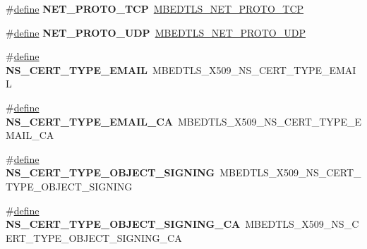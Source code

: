 \begin{DoxyCompactItemize}
\item 
\mbox{\label{compat-1_83_8h_a32ba3ba53f92561f4c6ce17476b6aa47}} 
\#\hyperlink{structdefine}{define} {\bfseries N\+E\+T\+\_\+\+P\+R\+O\+T\+O\+\_\+\+T\+CP}~\hyperlink{net__sockets_8h_a989e1bc1aae7e48ac318d5ddd24efa3b}{M\+B\+E\+D\+T\+L\+S\+\_\+\+N\+E\+T\+\_\+\+P\+R\+O\+T\+O\+\_\+\+T\+CP}
\item 
\mbox{\label{compat-1_83_8h_a10aa117699627c9d4fe7f03cfc571a73}} 
\#\hyperlink{structdefine}{define} {\bfseries N\+E\+T\+\_\+\+P\+R\+O\+T\+O\+\_\+\+U\+DP}~\hyperlink{net__sockets_8h_a8d6d212e9f0ea5756fff8d06c46f4f44}{M\+B\+E\+D\+T\+L\+S\+\_\+\+N\+E\+T\+\_\+\+P\+R\+O\+T\+O\+\_\+\+U\+DP}
\item 
\mbox{\label{compat-1_83_8h_aa06876013b3e2b9098529e18e17e96e9}} 
\#\hyperlink{structdefine}{define} {\bfseries N\+S\+\_\+\+C\+E\+R\+T\+\_\+\+T\+Y\+P\+E\+\_\+\+E\+M\+A\+IL}~M\+B\+E\+D\+T\+L\+S\+\_\+\+X509\+\_\+\+N\+S\+\_\+\+C\+E\+R\+T\+\_\+\+T\+Y\+P\+E\+\_\+\+E\+M\+A\+IL
\item 
\mbox{\label{compat-1_83_8h_a62f25762eb59728f92b07d61ae2057a5}} 
\#\hyperlink{structdefine}{define} {\bfseries N\+S\+\_\+\+C\+E\+R\+T\+\_\+\+T\+Y\+P\+E\+\_\+\+E\+M\+A\+I\+L\+\_\+\+CA}~M\+B\+E\+D\+T\+L\+S\+\_\+\+X509\+\_\+\+N\+S\+\_\+\+C\+E\+R\+T\+\_\+\+T\+Y\+P\+E\+\_\+\+E\+M\+A\+I\+L\+\_\+\+CA
\item 
\mbox{\label{compat-1_83_8h_ab74494b8a65972aebb605bdd9680d545}} 
\#\hyperlink{structdefine}{define} {\bfseries N\+S\+\_\+\+C\+E\+R\+T\+\_\+\+T\+Y\+P\+E\+\_\+\+O\+B\+J\+E\+C\+T\+\_\+\+S\+I\+G\+N\+I\+NG}~M\+B\+E\+D\+T\+L\+S\+\_\+\+X509\+\_\+\+N\+S\+\_\+\+C\+E\+R\+T\+\_\+\+T\+Y\+P\+E\+\_\+\+O\+B\+J\+E\+C\+T\+\_\+\+S\+I\+G\+N\+I\+NG
\item 
\mbox{\label{compat-1_83_8h_a57c9011afb5ab5f02020e1e31b43b871}} 
\#\hyperlink{structdefine}{define} {\bfseries N\+S\+\_\+\+C\+E\+R\+T\+\_\+\+T\+Y\+P\+E\+\_\+\+O\+B\+J\+E\+C\+T\+\_\+\+S\+I\+G\+N\+I\+N\+G\+\_\+\+CA}~M\+B\+E\+D\+T\+L\+S\+\_\+\+X509\+\_\+\+N\+S\+\_\+\+C\+E\+R\+T\+\_\+\+T\+Y\+P\+E\+\_\+\+O\+B\+J\+E\+C\+T\+\_\+\+S\+I\+G\+N\+I\+N\+G\+\_\+\+CA
\item 
\mbox{\label{compat-1_83_8h_a387e2b15df37666dfd95646bf647dae1}} 

\end{DoxyCompactItemize}
